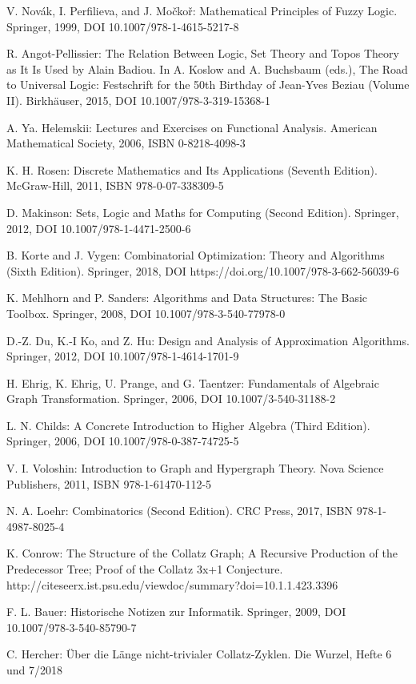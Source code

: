 \documentclass{SciPress_2015}
\begin{document}
\begin{thebibliography}{99}
V. Novák, I. Perfilieva, and J. Močkoř: Mathematical Principles of
Fuzzy Logic. Springer, 1999, DOI 10.1007/978-1-4615-5217-8

R. Angot-Pellissier: The Relation Between Logic, Set Theory and Topos
Theory as It Is Used by Alain Badiou. In A. Koslow and A. Buchsbaum
(eds.), The Road to Universal Logic: Festschrift for the 50th Birthday
of Jean-Yves Beziau (Volume II). Birkhäuser, 2015,
DOI 10.1007/978-3-319-15368-1

A. Ya. Helemskii: Lectures and Exercises on Functional Analysis.
American Mathematical Society, 2006, ISBN 0-8218-4098-3

K. H. Rosen: Discrete Mathematics and Its Applications (Seventh Edition).
McGraw-Hill, 2011, ISBN 978-0-07-338309-5

D. Makinson: Sets, Logic and Maths for Computing (Second Edition).
Springer, 2012, DOI 10.1007/978-1-4471-2500-6

B. Korte and J. Vygen: Combinatorial Optimization: Theory and Algorithms
(Sixth Edition). Springer, 2018,
DOI https://doi.org/10.1007/978-3-662-56039-6

K. Mehlhorn and P. Sanders: Algorithms and Data Structures: The Basic
Toolbox. Springer, 2008, DOI 10.1007/978-3-540-77978-0

D.-Z. Du, K.-I Ko, and Z. Hu: Design and Analysis of Approximation
Algorithms. Springer, 2012, DOI 10.1007/978-1-4614-1701-9

H. Ehrig, K. Ehrig, U. Prange, and G. Taentzer: Fundamentals
of Algebraic Graph Transformation. Springer, 2006,
DOI 10.1007/3-540-31188-2

L. N. Childs: A Concrete Introduction to Higher Algebra (Third Edition). 
Springer, 2006, DOI 10.1007/978-0-387-74725-5

V. I. Voloshin: Introduction to Graph and Hypergraph Theory.
Nova Science Publishers, 2011, ISBN 978-1-61470-112-5

N. A. Loehr: Combinatorics (Second Edition).
CRC Press, 2017, ISBN 978-1-4987-8025-4

K. Conrow: The Structure of the Collatz Graph; A Recursive Production
of the Predecessor Tree; Proof of the Collatz 3x+1 Conjecture.
http://citeseerx.ist.psu.edu/viewdoc/summary?doi=10.1.1.423.3396

F. L. Bauer: Historische Notizen zur Informatik.
Springer, 2009, DOI 10.1007/978-3-540-85790-7

C. Hercher: Über die Länge nicht-trivialer Collatz-Zyklen.
Die Wurzel, Hefte 6 und 7/2018 

\end{thebibliography}
\end{document}
